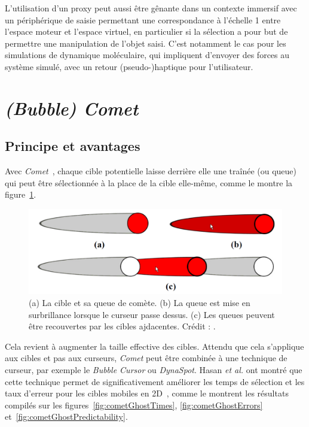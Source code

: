 	L'utilisation d'un proxy peut aussi être gênante dans un contexte immersif avec un périphérique de saisie permettant une correspondance à l'échelle 1 entre l'espace moteur et l'espace virtuel, en particulier si la sélection a pour but de permettre une manipulation de l'objet saisi. C'est notamment le cas pour les simulations de dynamique moléculaire, qui impliquent d'envoyer des forces au système simulé, avec un retour (pseudo-)haptique pour l'utilisateur.

\section{\emph{(Bubble) Comet}}
	\subsection{Principe et avantages}
	Avec \emph{Comet}~\cite{hasan2011comet}, chaque cible potentielle laisse derrière elle une traînée (ou queue) qui peut être sélectionnée à la place de la cible elle-même, comme le montre la figure~\ref{fig:comet}.
	
	\begin{figure}[H]
		\centering
		\includegraphics[width=\textwidth]{figures/ch2/comet}
		\caption[La technique \emph{Comet}]{(a) La cible et sa queue de comète. (b) La queue est mise en surbrillance lorsque le curseur passe dessus. (c) Les queues peuvent être recouvertes par les cibles ajdacentes. Crédit : \cite{hasan2011comet}.}
		\label{fig:comet}
	\end{figure}	
	
	Cela revient à augmenter la taille effective des cibles. Attendu que cela s'applique aux cibles et pas aux curseurs, \emph{Comet} peut être combinée à une technique de curseur, par exemple le \emph{Bubble Cursor} ou \emph{DynaSpot}. Hasan \emph{et al.} ont montré que cette technique permet de significativement améliorer les temps de sélection et les taux d'erreur pour les cibles mobiles en 2D~\cite{hasan2011comet}, comme le montrent les résultats compilés sur les figures~\ref{fig:cometGhostTimes}, \ref{fig:cometGhostErrors} et~\ref{fig:cometGhostPredictability}.

